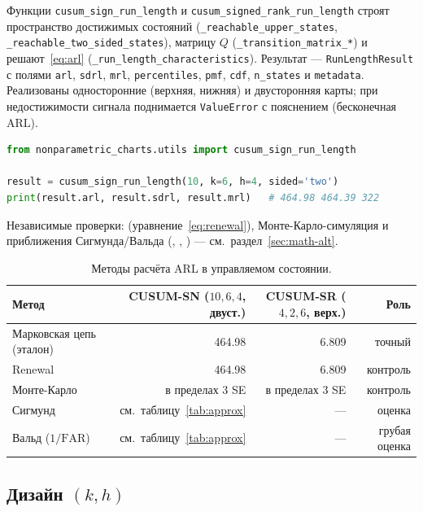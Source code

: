 \documentclass[11pt,a4paper]{article}
\newcommand{\ARL}{\mathrm{ARL}}
\newcommand{\FAR}{\mathrm{FAR}}
\begin{document}
Функции \texttt{cusum\_sign\_run\_length} и
\texttt{cusum\_signed\_rank\_run\_length} строят пространство достижимых
состояний (\texttt{\_reachable\_upper\_states},
\texttt{\_reachable\_two\_sided\_states}), матрицу $Q$
(\texttt{\_transition\_matrix\_*}) и решают~\eqref{eq:arl}
(\texttt{\_run\_length\_characteristics}). Результат ---
\texttt{RunLengthResult} с полями \texttt{arl}, \texttt{sdrl},
\texttt{mrl}, \texttt{percentiles}, \texttt{pmf}, \texttt{cdf},
\texttt{n\_states} и \texttt{metadata}. Реализованы односторонние
(верхняя, нижняя) и двусторонняя карты; при недостижимости сигнала
поднимается \texttt{ValueError} с пояснением (бесконечная $\ARL$).

\begin{lstlisting}[language=Python]
from nonparametric_charts.utils import cusum_sign_run_length

result = cusum_sign_run_length(10, k=6, h=4, sided='two')
print(result.arl, result.sdrl, result.mrl)   # 464.98 464.39 322
\end{lstlisting}

Независимые проверки: 
(уравнение~\eqref{eq:renewal}), Монте-Карло-симуляция
 и приближения Сигмунда/Вальда
(, , ) ---
см.\ раздел~\ref{sec:math-alt}.

\begin{table}[htbp]\centering
\caption{Методы расчёта $\ARL$ в управляемом состоянии.}
\label{tab:methods}
\small
\begin{tabular}{@{}l r r r@{}}
\toprule
Метод & CUSUM-SN ($10,6,4$, двуст.) & CUSUM-SR ($4,2,6$, верх.) & Роль \\
\midrule
Марковская цепь (эталон) & 464.98 & 6.809 & точный \\
Renewal & 464.98 & 6.809 & контроль \\
Монте-Карло & в пределах 3 SE & в пределах 3 SE & контроль \\
Сигмунд & см.\ таблицу~\ref{tab:approx} & --- & оценка \\
Вальд ($1/\FAR$) & см.\ таблицу~\ref{tab:approx} & --- & грубая оценка \\
\bottomrule
\end{tabular}
\normalsize
\end{table}

\subsection{Дизайн $(k,h)$}
\label{sec:impl-design}
\end{document}
